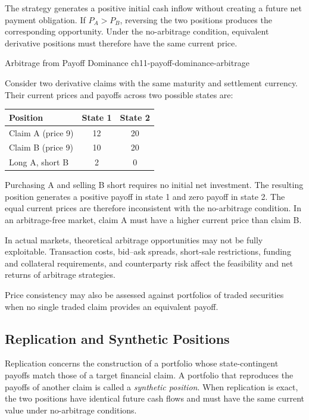 The strategy generates a positive initial cash
inflow without creating a future net payment
obligation. If $P_A>P_B$, reversing the two
positions produces the corresponding opportunity.
Under the no-arbitrage condition, equivalent
derivative positions must therefore have the
same current price.

\begin{example}{Arbitrage from Payoff Dominance}
{ch11-payoff-dominance-arbitrage}

Consider two derivative claims with the same
maturity and settlement currency. Their current
prices and payoffs across two possible states are:

\begin{center}
\begin{tabular}{lcc}
\toprule
\textbf{Position}
& \textbf{State 1}
& \textbf{State 2} \\
\midrule
Claim A (price 9) & 12 & 20 \\
Claim B (price 9) & 10 & 20 \\
\midrule
Long A, short B & 2 & 0 \\
\bottomrule
\end{tabular}
\end{center}

Purchasing A and selling B short requires no
initial net investment. The resulting position
generates a positive payoff in state 1 and zero
payoff in state 2. The equal current prices are
therefore inconsistent with the no-arbitrage
condition. In an arbitrage-free market, claim A
must have a higher current price than claim B.

\end{example}

In actual markets, theoretical arbitrage opportunities
may not be fully exploitable. Transaction costs,
bid--ask spreads, short-sale restrictions, funding
and collateral requirements, and counterparty risk
affect the feasibility and net returns of arbitrage
strategies. 

Price consistency may also be assessed against
portfolios of traded securities when no single
traded claim provides an equivalent payoff.


\subsection{Replication and Synthetic Positions}

Replication concerns the construction of a portfolio
whose state-contingent payoffs match those of a target
financial claim. A portfolio that reproduces the
payoffs of another claim is called a
\emph{synthetic position}. When replication is exact,
the two positions have identical future cash flows
and must have the same current value under
no-arbitrage conditions.

